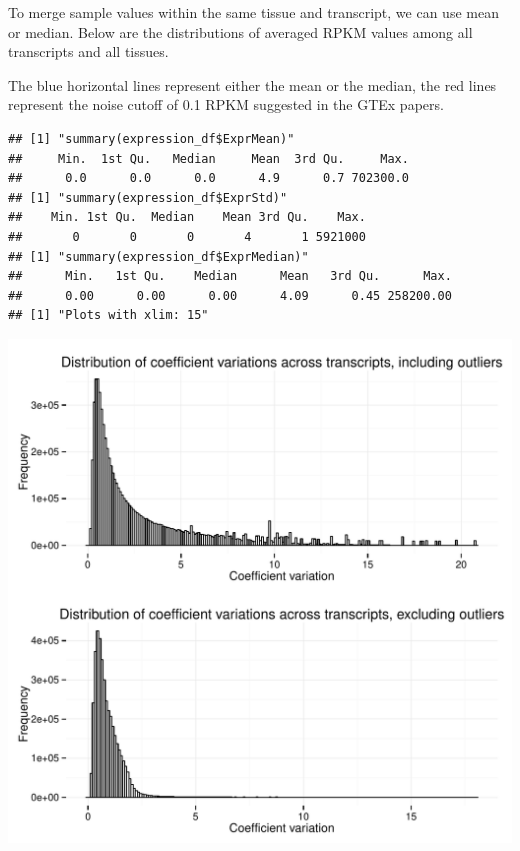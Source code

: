 \documentclass{article}\usepackage[]{graphicx}\usepackage[]{color}
\makeatletter
\def\maxwidth{ %
  \ifdim\Gin@nat@width>\linewidth
    \linewidth
  \else
    \Gin@nat@width
  \fi
}
\newenvironment{kframe}{%
 \def\at@end@of@kframe{}%
 \ifinner\ifhmode%
  \def\at@end@of@kframe{\end{minipage}}%
  \begin{minipage}{\columnwidth}%
 \fi\fi%
 \def\FrameCommand##1{\hskip\@totalleftmargin \hskip-\fboxsep
 \colorbox{shadecolor}{##1}\hskip-\fboxsep
     \hskip-\linewidth \hskip-\@totalleftmargin \hskip\columnwidth}%
 \MakeFramed {\advance\hsize-\width
   \@totalleftmargin\z@ \linewidth\hsize
   \@setminipage}}%
 {\par\unskip\endMakeFramed%
 \at@end@of@kframe}
\newenvironment{knitrout}{}{} %
\makeatother
\begin{document}
To merge sample values within the same tissue and transcript, we can use mean or median. Below are the distributions of averaged RPKM values among all transcripts and all tissues.\par
The blue horizontal lines represent either the mean or the median, the red lines represent the noise cutoff of 0.1 RPKM suggested in the GTEx papers.

\begin{knitrout}
\color{fgcolor}\begin{kframe}
\begin{verbatim}
## [1] "summary(expression_df$ExprMean)"
##     Min.  1st Qu.   Median     Mean  3rd Qu.     Max. 
##      0.0      0.0      0.0      4.9      0.7 702300.0 
## [1] "summary(expression_df$ExprStd)"
##    Min. 1st Qu.  Median    Mean 3rd Qu.    Max. 
##       0       0       0       4       1 5921000 
## [1] "summary(expression_df$ExprMedian)"
##      Min.   1st Qu.    Median      Mean   3rd Qu.      Max. 
##      0.00      0.00      0.00      4.09      0.45 258200.00 
## [1] "Plots with xlim: 15"
\end{verbatim}
\end{kframe}
\includegraphics[width=\maxwidth]{figure/transcript_expression_averages-1} 


\end{knitrout}
\end{document}
